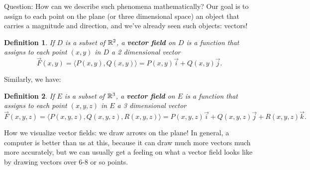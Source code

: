 \documentclass[12pt]{article}
\newcommand{\vF}{\vec{F}}
\newcommand{\rg}{\rangle}
\renewcommand{\i}{\vec{i}}
\renewcommand{\j}{\vec{j}}
\renewcommand{\k}{\vec{k}}
\newtheorem{definition}{Definition}
\begin{document}
Question: How can we describe such phenomena mathematically? Our goal is to assign to each point on the plane (or three dimensional space) an object that carries a magnitude and direction, and we've already seen such objects: vectors!

\begin{definition} If $D$ is a subset of $\mathbb{R}^2$, a\textbf{ vector field} on $D$ is a function that assigns to each point $(x,y)$ in $D$ a 2 dimensional vector $$\vF(x,y)=\langle P(x,y),Q(x,y)\rg=P(x,y)\i+Q(x,y)\j.$$
\end{definition}
Similarly, we have: 
\begin{definition} If $E$ is a subset of $\mathbb{R}^3$, a \textbf{vector field} on $E$ is a function that assigns to each point $(x,y,z)$ in $E$ a 3 dimensional vector $$\vF(x,y,z)=\langle P(x,y,z),Q(x,y,z),R(x,y,z)\rg=P(x,y,z)\i+Q(x,y,z)\j+R(x,y,z)\k.$$
\end{definition}

How we visualize vector fields: we draw arrows on the plane! In general, a computer is better than us at this, because it can draw much more vectors much more accurately, but we can usually get a feeling on what a vector field looks like by drawing vectors over 6-8 or so points. 
\end{document}
